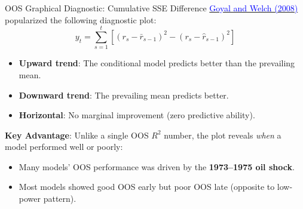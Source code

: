 \documentclass{beamer}
\begin{document}
\begin{frame}{OOS Graphical Diagnostic: Cumulative SSE Difference}
     \href{https://doi.org/10.1093/rfs/hhm014}{\textcolor{blue}{Goyal and Welch (2008)}} popularized the following diagnostic plot:
    \begin{equation}
        y_t = \sum_{s=1}^{t} \left[ (r_s - \bar{r}_{s-1})^2 - (r_s - \hat{r}_{s-1})^2 \right]
    \end{equation}
    \begin{itemize}
        \item \textbf{Upward trend}: The conditional model predicts better than the prevailing mean.
        \item \textbf{Downward trend}: The prevailing mean predicts better.
        \item \textbf{Horizontal}: No marginal improvement (zero predictive ability).
    \end{itemize}

    \vspace{0.3cm}
    \textbf{Key Advantage}: Unlike a single OOS $R^2$ number, the plot reveals \textit{when} a model performed well or poorly:
    \begin{itemize}
        \item Many models' OOS performance was driven by the \textbf{1973--1975 oil shock}.
        \item Most models showed good OOS early but poor OOS late (opposite to low-power pattern).
    \end{itemize}
\end{frame}
\end{document}

